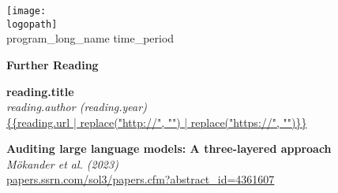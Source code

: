 \documentclass[12pt]{article}
\def\logopath{../assets/caiac_logo.png}  %
\def\programlongname{
    {{ program_long_name }}
}
\def\timeperiod{
    {{ time_period }}
}
\begin{document}
\thispagestyle{empty} %

\begin{center}
    \texttt{[image: \\logopath]}\\
    \vspace{0.2em}
    {\color{primaryFaded}\programlongname\color{primaryFaded}\timeperiod}
\end{center}

\vspace{1em}

\begin{center}
    {\LARGE \textbf{Further Reading}}
\end{center}

\vspace{1em}

\noindent\textbf{ {{reading.title}} }\\
\textit{ {{reading.author}} ({{reading.year}}) }\\
{\small \url{ {{reading.url | replace("http://", "") | replace("https://", "")}} }}

\vspace{1em}
\noindent\textbf{ Auditing large language models: A three-layered approach }\\
\textit{ Mökander et al. (2023) }\\
{\small \url{ papers.ssrn.com/sol3/papers.cfm?abstract_id=4361607 }}

\vspace{4em}
\end{document}
